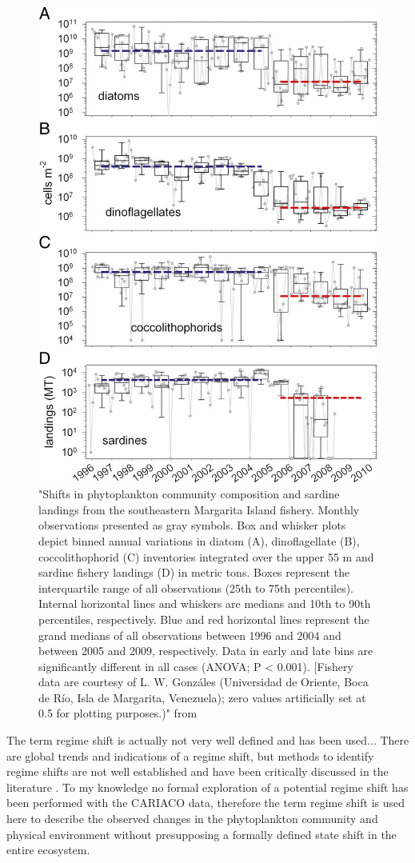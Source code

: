 \begin{figure}
\centering
\includegraphics[trim = 0mm 0mm 0mm 0mm, clip, width=0.7\linewidth]{./Chp2-Pre/Tayloretal2012_F3.large.jpg}
\caption[Scheme]{\small {"Shifts in phytoplankton community composition and sardine landings from the southeastern Margarita Island fishery. Monthly observations presented as gray symbols. Box and whisker plots depict binned annual variations in diatom (A), dinoflagellate (B), coccolithophorid (C) inventories integrated over the upper 55 m and sardine fishery landings (D) in metric tons. Boxes represent the interquartile range of all observations (25th to 75th percentiles). Internal horizontal lines and whiskers are medians and 10th to 90th percentiles, respectively. Blue and red horizontal lines represent the grand medians of all observations between 1996 and 2004 and between 2005 and 2009, respectively. Data in early and late bins are significantly different in all cases (ANOVA; P < 0.001). [Fishery data are courtesy of L. W. Gonzáles (Universidad de Oriente, Boca de Río, Isla de Margarita, Venezuela); zero values artificially set at 0.5 for plotting purposes.)" from \citet{Taylor2012}}}
\label{TaylorSHIFTS}
\end{figure}




The term regime shift is actually not very well defined and has been used... \citep{DeYoung2004a}
There are global trends and indications of a regime shift, but methods to identify regime shifts are not well established and have been critically discussed in the literature \citep{Steele2004a, Mantua2004a, Litzow2016a}. To my knowledge no formal exploration of a potential regime shift has been performed with the CARIACO data, therefore the term regime shift is used here to describe the observed changes in the phytoplankton community and physical environment without presupposing a formally defined state shift in the entire ecosystem. 


